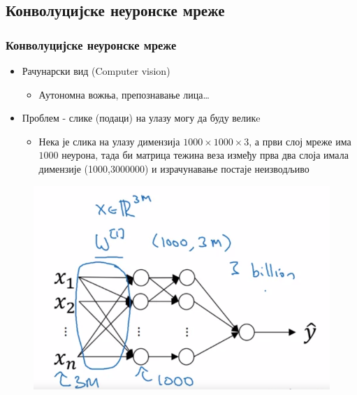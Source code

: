 \subsection{Конволуцијске неуронске мреже}
\begin{frame}
\frametitle{Конволуцијске неуронске мреже}

\begin{itemize}
 \item \alert{Рачунарски вид} (\alert{Computer vision})
 \begin{itemize}
  \item Аутономна вожња, препознавање лица\dots
 \end{itemize}
 \item Проблем - \alert{слике} (подаци) на улазу могу да буду \alert{великe}
 \begin{itemize}
 \item Нека је слика на улазу димензија $1000 \times 1000 \times 3$,
 а први слој мреже има $1000$ неурона, тада би матрица
 тежина веза између прва два слоја имала димензије (1000,3000000) и
 \alert{израчунавање} постаје \alert{неизводљиво}
 \end{itemize}
\end{itemize}
\begin{figure}[H]
  \centering
      \includegraphics[scale=0.27]{slike/ngFCVision.png} \hspace{1.2cm}      

\end{figure}
\end{frame}
